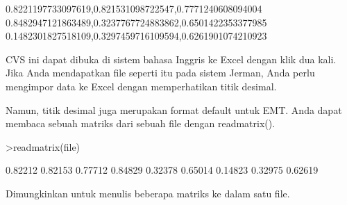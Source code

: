 \documentclass[a4paper,10pt]{article}
\begin{document}
\begin{eulernotebook}
\begin{eulercomment}
\begin{eulercomment}
\begin{eulercomment}
\begin{eulercomment}
\begin{eulercomment}
\begin{eulercomment}
\begin{eulercomment}
\begin{eulercomment}
\begin{eulercomment}
\begin{eulercomment}
\begin{eulercomment}
\begin{eulercomment}
\begin{eulercomment}
\begin{eulercomment}
\begin{eulercomment}
\begin{eulercomment}
\begin{eulercomment}
\begin{eulercomment}
\begin{eulercomment}
\begin{eulercomment}
\begin{eulercomment}
\begin{eulercomment}
\begin{eulercomment}
\begin{eulercomment}
\begin{eulercomment}
\begin{eulercomment}
\begin{eulercomment}
\begin{eulercomment}
\begin{eulercomment}
\begin{eulercomment}
\begin{eulercomment}
\begin{eulercomment}
\begin{eulercomment}
\begin{eulercomment}
\begin{eulercomment}
\begin{eulercomment}
\begin{eulercomment}
\begin{eulercomment}
\begin{eulercomment}
\begin{eulercomment}
\begin{eulercomment}
\begin{eulercomment}
\begin{eulercomment}
\begin{eulercomment}
\begin{eulercomment}
\begin{eulercomment}
\begin{eulercomment}
\begin{eulercomment}
\begin{eulercomment}
\begin{eulercomment}
\begin{euleroutput}
  0.8221197733097619,0.821531098722547,0.7771240608094004
  0.8482947121863489,0.3237767724883862,0.6501422353377985
  0.1482301827518109,0.3297459716109594,0.6261901074210923
  
\end{euleroutput}
\begin{eulercomment}
CVS ini dapat dibuka di sistem bahasa Inggris ke Excel dengan klik dua
kali. Jika Anda mendapatkan file seperti itu pada sistem Jerman, Anda
perlu mengimpor data ke Excel dengan memperhatikan titik desimal.

Namun, titik desimal juga merupakan format default untuk EMT. Anda
dapat membaca sebuah matriks dari sebuah file dengan readmatrix().
\end{eulercomment}
\begin{eulerprompt}
>readmatrix(file)
\end{eulerprompt}
\begin{euleroutput}
    0.82212   0.82153   0.77712 
    0.84829   0.32378   0.65014 
    0.14823   0.32975   0.62619 
\end{euleroutput}
\begin{eulercomment}
Dimungkinkan untuk menulis beberapa matriks ke dalam satu file.

\end{eulercomment}
\end{eulercomment}
\end{eulercomment}
\end{eulercomment}
\end{eulercomment}
\end{eulercomment}
\end{eulercomment}
\end{eulercomment}
\end{eulercomment}
\end{eulercomment}
\end{eulercomment}
\end{eulercomment}
\end{eulercomment}
\end{eulercomment}
\end{eulercomment}
\end{eulercomment}
\end{eulercomment}
\end{eulercomment}
\end{eulercomment}
\end{eulercomment}
\end{eulercomment}
\end{eulercomment}
\end{eulercomment}
\end{eulercomment}
\end{eulercomment}
\end{eulercomment}
\end{eulercomment}
\end{eulercomment}
\end{eulercomment}
\end{eulercomment}
\end{eulercomment}
\end{eulercomment}
\end{eulercomment}
\end{eulercomment}
\end{eulercomment}
\end{eulercomment}
\end{eulercomment}
\end{eulercomment}
\end{eulercomment}
\end{eulercomment}
\end{eulercomment}
\end{eulercomment}
\end{eulercomment}
\end{eulercomment}
\end{eulercomment}
\end{eulercomment}
\end{eulercomment}
\end{eulercomment}
\end{eulercomment}
\end{eulercomment}
\end{eulercomment}
\end{eulernotebook}
\end{document}
